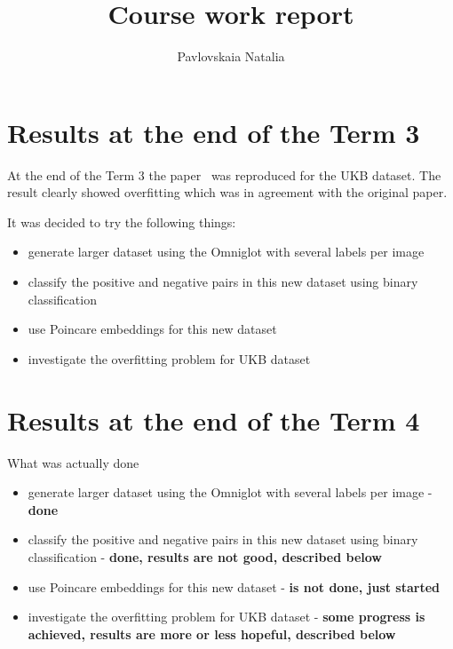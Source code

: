 \documentclass[10pt,a4paper]{article}
\author{Pavlovskaia Natalia}
\title{Course work report}
\begin{document}
    \maketitle

    \section{Results at the end of the Term 3}\label{sec:resultsAtTheEndOfTheTerm3}

    At the end of the Term 3 the paper~\cite{original_paper} was reproduced for the UKB dataset.
    The result clearly showed overfitting which was in agreement with the original paper.

    It was decided to try the following things:
    \begin{itemize}
        \item {generate larger dataset using the Omniglot with several labels per image}
        \item {classify the positive and negative pairs in this new dataset using binary classification}
        \item {use Poincare embeddings for this new dataset}
        \item {investigate the overfitting problem for UKB dataset}
    \end{itemize}

    \section{Results at the end of the Term 4}\label{sec:results}

    What was actually done

    \begin{itemize}
        \item {generate larger dataset using the Omniglot with several labels per image - \textbf{done}}
        \item {classify the positive and negative pairs in this new dataset using binary classification - \textbf{done,
        results are not good, described below}}
        \item {use Poincare embeddings for this new dataset - \textbf{is not done, just started}}
        \item {investigate the overfitting problem for UKB dataset - \textbf{some progress is achieved,
        results are more or less hopeful, described below}}
    \end{itemize}
\end{document}
